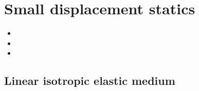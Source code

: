 \documentclass[letterpaper,10pt,english]{jupyterBook}
\begin{document}
\chapter{Small displacement \sphinxhyphen{} statics}
\label{\detokenize{ch/solids/small-displacements-statics:small-displacement-statics}}\label{\detokenize{ch/solids/small-displacements-statics:solid-mechanics-intro-small-displacements-statics}}\label{\detokenize{ch/solids/small-displacements-statics::doc}}\begin{itemize}
\item {} 
\sphinxAtStartPar
{}

\item {} 
\sphinxAtStartPar
{}

\item {} 
\sphinxAtStartPar
{}

\end{itemize}


\section{Linear isotropic elastic medium}
\label{\detokenize{ch/solids/small-displacements-statics:linear-isotropic-elastic-medium}}\label{\detokenize{ch/solids/small-displacements-statics:solid-mechanics-intro-small-displacements-statics-elastic-medium}}
\end{document}
